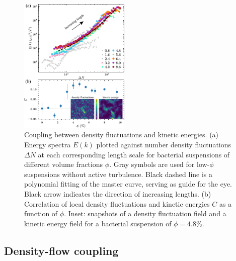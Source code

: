 \documentclass[twocolumn,aps,prx,amsmath,amssymb,longbibliography]{revtex4-2}
\begin{document}
\begin{figure}[t]
\begin{center}
\includegraphics[width=0.47\textwidth]{figures/GNF-energy-spectra-correlation/v6.pdf}
\caption[The correlation between GNF and kinetic energy and kinetic energy spectra.]
{
Coupling between density fluctuations and kinetic energies.
(a) Energy spectra $E(k)$ plotted against number density fluctuations $\Delta N$ at each corresponding length scale for bacterial suspensions of different volume fractions $\phi$. Gray symbols are used for low-$\phi$ suspensions without active turbulence. Black dashed line is a polynomial fitting of the master curve, serving as guide for the eye. Black arrow indicates the direction of increasing lengths.
(b) Correlation of local density fluctuations and kinetic energies $C$ as a function of $\phi$. Inset: snapshots of a density fluctuation field and a kinetic energy field for a bacterial suspension of $\phi = 4.8\%$.
}
\label{fig:GNF-energy-spectra-correlation}
\end{center}
\end{figure}

\subsection{Density-flow coupling} \label{Density-flow coupling}
\end{document}
